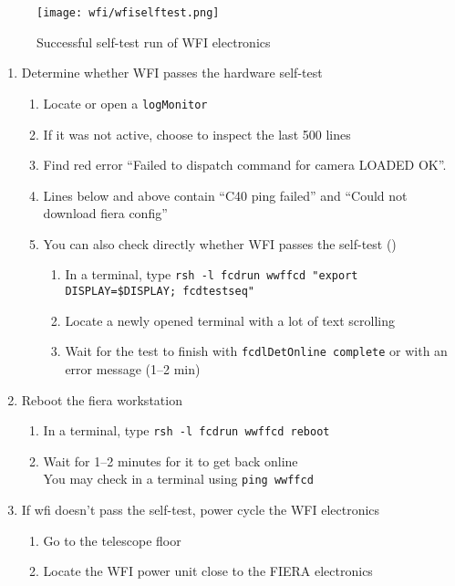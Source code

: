 \documentclass[11pt,fleqn,a4paper]{book}
\begin{document}
\begin{figure}
    \centering
    \texttt{[image: wfi/wfiselftest.png]}
    \caption{Successful self-test run of WFI electronics}
    \label{fig:wfiselftest}
\end{figure}
\begin{enumerate}
  \item Determine whether WFI passes the hardware self-test
    \begin{enumerate}
	\item Locate or open a \texttt{logMonitor}
	\item If it was not active, choose to inspect the last 500 lines
	\item Find red error ``Failed to dispatch command for camera LOADED OK''.
	\item Lines below and above contain ``C40 ping failed'' and ``Could not download \gls{fiera} config''
	\item You can also check directly whether WFI passes the self-test
            ()\\
        \begin{enumerate}
          \item In a terminal, type \texttt{rsh -l fcdrun \gls{wwffcd} "export DISPLAY=\$DISPLAY; fcdtestseq"}
          \item Locate a newly opened terminal with a lot of text scrolling
          \item Wait for the test to finish with \texttt{fcdlDetOnline complete} or with an error message (1--2 min)
        \end{enumerate} 
    \end{enumerate}
  \item\label{list:wfionline:reboot} Reboot the \gls{fiera} workstation
	\begin{enumerate}
		\item In a terminal, type \texttt{rsh -l fcdrun \gls{wwffcd} reboot}
	        \item Wait for 1--2 minutes for it to get back online\\
		      You may check in a terminal using \texttt{ping \gls{wwffcd}}
	\end{enumerate}
  \item If \gls{wfi} doesn't pass the self-test, \gls{power cycle} the WFI electronics 
	\begin{enumerate}
		\item Go to the telescope floor
		\item Locate the WFI power unit close to the FIERA electronics

\end{enumerate}
\end{enumerate}
\end{document}
